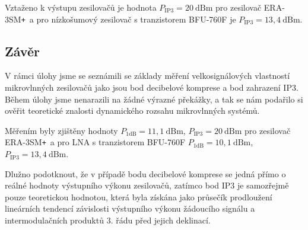 \documentclass[11pt,a4paper]{article}
\newcommand{\plus}{{\texttt{+}}}
\begin{document}
Vztaženo k výstupu zesilovačů je hodnota $P_{\mathrm{IP3}} = 20~\mathrm{dBm}$ pro zesilovač ERA-3SM\plus~a pro nízkošumový zesilovač s tranzistorem BFU-760F je $P_{\mathrm{IP3}} = 13,4~\mathrm{dBm}$.

\subsection*{Závěr}
V rámci úlohy jsme se seznámili se základy měření velkosignálových vlastností mikrovlnných zesilovačů jako jsou bod decibelové komprese a bod zahrazení IP3. Během úlohy jsme nenarazili na žádné výrazné překážky, a tak se nám podařilo si ověřit teoretické znalosti dynamického rozsahu mikrovlnných systémů.

Měřením byly zjištěny hodnoty $P_{1\mathrm{dB}} = 11,1~\mathrm{dBm}$, $P_{\mathrm{IP3}} = 20~\mathrm{dBm}$ pro zesilovač ERA-3SM\plus~a pro LNA s tranzistorem BFU-760F $P_{1\mathrm{dB}} = 10,1~\mathrm{dBm}$, $P_{\mathrm{IP3}} = 13,4~\mathrm{dBm}$.

Dlužno podotknout, že v případě bodu decibelové komprese se jedná přímo o reálné hodnoty výstupního výkonu zesilovačů, zatímco bod IP3 je samozřejmě pouze teoretickou hodnotou, která byla získána jako průsečík prodloužení lineárních tendencí závislosti výstupního výkonu žádoucího signálu a intermodulačních produktů 3. řádu před jejich deklinací.
\end{document}
